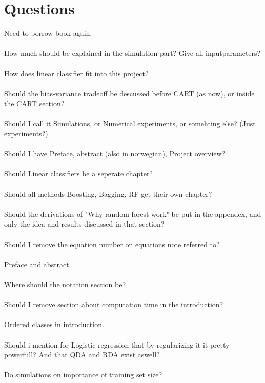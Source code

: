 \section{Questions}
\label{sec:Questions}
Need to borrow book again. \\
\\
How much should be explained in the simulation part? Give all inputparameters?\\
\\
How does linear classifier fit into this project?\\
\\
Should the bias-variance tradeoff be descussed before CART (as now), or inside the CART section?\\
\\
Should I call it Simulations, or Numerical experiments, or somehting else? (Just experiments?)\\
\\
Should I have Preface, abstract (also in norwegian), Project overview?\\
\\
Should Linear classifiers be a seperate chapter? \\
\\
Should all methods Boosting, Bagging, RF get their own chapter?\\
\\
Should the derivations of "Why random forest work" be put in the appendex, and only the idea and results discussed in that section?\\
\\
Should I remove the equation number on equations note referred to?\\
\\
Preface and abstract.\\
\\
Where should the notation section be? \\
\\
Should I remove section about computation time in the introduction? \\
\\
Ordered classes in introduction.\\
\\
Should i mention for Logistic regression that by regularizing it it pretty powerfull? And that QDA and RDA exist aswell?\\
\\
Do simulations on importance of training set size? \\
\\
